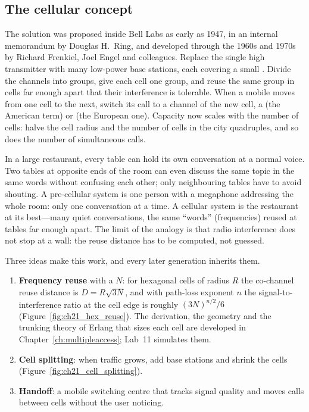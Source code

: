 \subsection{The cellular concept}

The solution was proposed inside Bell Labs as early as 1947, in an internal memorandum by Douglas
H.~Ring, and developed through the 1960s and 1970s by Richard Frenkiel, Joel Engel and colleagues.
Replace the single high transmitter with many low-power base stations, each covering a small
. Divide the channels into groups, give each cell one group, and reuse the same group in
cells far enough apart that their interference is tolerable. When a mobile moves from one cell to
the next, switch its call to a channel of the new cell, a  (the American term) or
 (the European one). Capacity now scales with the number of cells: halve the cell
radius and the number of cells in the city quadruples, and so does the number of simultaneous
calls.

\begin{analogy}
In a large restaurant, every table can hold its own conversation at a normal voice. Two tables at
opposite ends of the room can even discuss the same topic in the same words without confusing each
other; only neighbouring tables have to avoid shouting. A pre-cellular system is one person with a
megaphone addressing the whole room: only one conversation at a time. A cellular system is the
restaurant at its best---many quiet conversations, the same ``words'' (frequencies) reused at tables
far enough apart. The limit of the analogy is that radio interference does not stop at a wall: the
reuse distance has to be computed, not guessed.
\end{analogy}

Three ideas make this work, and every later generation inherits them.
\begin{enumerate}
\item \textbf{Frequency reuse} with a  $N$: for hexagonal cells of radius $R$
the co-channel reuse distance is $D=R\sqrt{3N}$, and with path-loss exponent $n$ the
signal-to-interference ratio at the cell edge is roughly $(3N)^{n/2}/6$
(Figure~\ref{fig:ch21_hex_reuse}). The derivation, the geometry and the trunking theory of Erlang
that sizes each cell are developed in Chapter~\ref{ch:multipleaccess}; Lab~11 simulates them.
\item \textbf{Cell splitting}: when traffic grows, add base stations and shrink the cells
(Figure~\ref{fig:ch21_cell_splitting}).
\item \textbf{Handoff}: a mobile switching centre that tracks signal quality and moves calls between
cells without the user noticing.
\end{enumerate}

